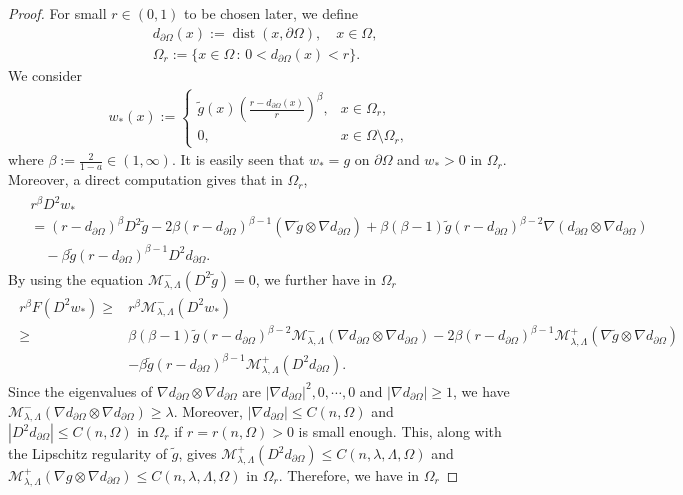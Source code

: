 \documentclass[11pt,oneside,english]{amsart}
\newcommand{\cM}{{\mathcal M}}
\newcommand{\be}{\beta}
\newcommand{\la}{\lambda}
\newcommand{\dist}{\operatorname{dist}}
\newcommand{\D}{\nabla}
\numberwithin{equation}{section}
\theoremstyle{plain}
\numberwithin{equation}{section}
\begin{document}
\begin{proof}
For small $r\in(0,1)$ to be chosen later, we define
\begin{align*}
    &d_{\partial\Omega}(x):=\dist(x,\partial\Omega),\quad x\in \Omega,\\
    &\Omega_r:=\{x\in\Omega\,:\,0<d_{\partial\Omega}(x)<r\}.
\end{align*}
We consider
\begin{align*}
    w_*(x):=\begin{cases}
        \tilde g(x)\left(\frac{r-d_{\partial\Omega}(x)}{r}\right)^\be,& x\in \Omega_r,\\
        0,&x\in \Omega\setminus\Omega_r,
    \end{cases}
\end{align*} 
where $\be:=\frac2{1-a}\in(1,\infty)$. It is easily seen that $w_*=g$ on $\partial\Omega$ and $w_*>0$ in $\Omega_r$.
Moreover, a direct computation gives that in $\Omega_r$,
\begin{align}\label{eq:subsol-comp-1}\begin{split}
    &r^\be D^2w_*\\
    &= (r-d_{\partial\Omega})^\be D^2\tilde g-2\be(r-d_{\partial\Omega})^{\be-1}(\D \tilde g\otimes\D d_{\partial\Omega})+\be(\be-1)\tilde g(r-d_{\partial\Omega})^{\be-2}\D (d_{\partial\Omega}\otimes\D d_{\partial\Omega})\\
    &\quad-\be\tilde g(r-d_{\partial\Omega})^{\be-1}D^2d_{\partial\Omega}.
\end{split}\end{align}
By using the equation $\cM_{\la,\Lambda}^-(D^2\tilde g)=0$, we further have in $\Omega_r$
\begin{align}
    \label{eq:subsol-comp-2}\begin{split}
     r^\be F(D^2w_*)\ge& r^\be \cM_{\la,\Lambda}^-(D^2w_*)\\
     \ge&\be(\be-1)\tilde g(r-d_{\partial\Omega})^{\be-2}\cM_{\la,\Lambda}^-(\D d_{\partial\Omega}\otimes\D d_{\partial\Omega})-2\be(r-d_{\partial\Omega})^{\be-1}\cM_{\la,\Lambda}^+(\D \tilde g\otimes \D d_{\partial\Omega})\\
    &-\be\tilde g(r-d_{\partial\Omega})^{\be-1}\cM_{\la,\Lambda}^+(D^2d_{\partial\Omega}).
\end{split}\end{align}
Since the eigenvalues of $\D d_{\partial\Omega}\otimes\D d_{\partial\Omega}$ are $|\D d_{\partial\Omega}|^2,0,\cdots,0$ and $|\D d_{\partial\Omega}|\ge1$, we have $\cM_{\la,\Lambda}^-(\D d_{\partial\Omega}\otimes\D d_{\partial\Omega})\ge\la$. Moreover, $|\D d_{\partial\Omega}|\le C(n,\Omega)$ and $|D^2d_{\partial\Omega}|\le C(n,\Omega)$ in $\Omega_r$ if $r=r(n,\Omega)>0$ is small enough. This, along with the Lipschitz regularity of $\tilde g$, gives $\cM_{\la,\Lambda}^+(D^2d_{\partial\Omega})\le C(n,\la,\Lambda,\Omega)$ and $\cM_{\la,\Lambda}^+(\D g\otimes\D d_{\partial\Omega})\le C(n,\la,\Lambda,\Omega)$ in $\Omega_r$. Therefore, we have in $\Omega_r$

\end{proof}
\end{document}
